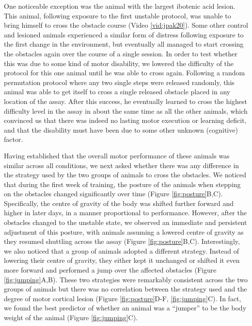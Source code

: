 One noticeable exception was the animal with the largest ibotenic acid lesion. This animal, following exposure to the first unstable protocol, was unable to bring himself to cross the obstacle course (Video \ref{vid:jpak20}). Some other control and lesioned animals experienced a similar form of distress following exposure to the first change in the environment, but eventually all managed to start crossing the obstacles again over the course of a single session. In order to test whether this was due to some kind of motor disability, we lowered the difficulty of the protocol for this one animal until he was able to cross again. Following a random permutation protocol where any two single steps were released randomly, this animal was able to get itself to cross a single released obstacle placed in any location of the assay. After this success, he eventually learned to cross the highest difficulty level in the assay in about the same time as all the other animals, which convinced us that there was indeed no lasting motor execution or learning deficit, and that the disability must have been due to some other unknown (cognitive) factor. 

Having established that the overall motor performance of these animals was similar across all conditions, we next asked whether there was any difference in the strategy used by the two groups of animals to cross the obstacles. We noticed that during the first week of training, the posture of the animals when stepping on the obstacles changed significantly over time (Figure \ref{fig:posture}B,C). Specifically, the centre of gravity of the body was shifted further forward and higher in later days, in a manner proportional to performance. However, after the obstacles changed to the unstable state, we observed an immediate and persistent adjustment of this posture, with animals assuming a lowered centre of gravity as they resumed shuttling across the assay (Figure \ref{fig:posture}B,C). Interestingly, we also noticed that a group of animals adopted a different strategy. Instead of lowering their centre of gravity, they either kept it unchanged or shifted it even more forward and performed a jump over the affected obstacles (Figure \ref{fig:jumping}A,B). These two strategies were remarkably consistent across the two groups of animals but there was no correlation between the strategy used and the degree of motor cortical lesion (Figure \ref{fig:posture}D-F, \ref{fig:jumping}C). In fact, we found the best predictor of whether an animal was a ``jumper'' to be the body weight of the animal (Figure \ref{fig:jumping}C).

